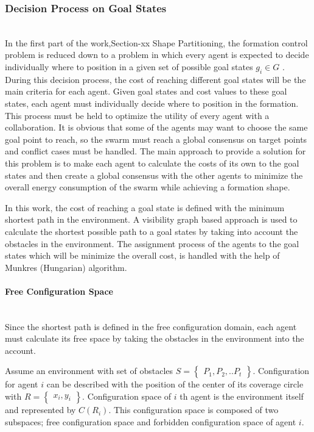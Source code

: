	
\subsubsection{Decision Process on Goal States}\hspace{0pt} \\
In the first part of the work,Section-xx Shape Partitioning, the formation control problem is reduced down to a problem in which every agent is expected to decide individually where to position in a given set of possible goal states $g_i \in G$ .  During this decision process, the cost of reaching different goal states will be the main criteria for each agent. Given goal states and cost values to these goal states, each agent must individually  decide where to position in the formation. This process must be held to optimize the utility of every agent with a collaboration. It is obvious that some of the agents may want to choose the same goal point to reach, so the swarm must reach a global consensus on target points and conflict cases must be handled. The main approach to provide a solution for this problem is to make each agent to calculate the costs of its own to the goal states and then create a global consensus with the other agents to minimize the overall energy consumption of the swarm while achieving a formation shape. 

In this work, the cost of reaching a goal state is defined with the minimum shortest path in the environment. A visibility graph based approach is used to calculate the shortest possible path to a goal states by taking into account the obstacles in the environment. The assignment process of the agents to the goal states which will be minimize the overall cost, is handled with the help of Munkres (Hungarian)  algorithm.
	
\paragraph{Free Configuration Space}\hspace{0pt} \\
Since the shortest path is defined in the free configuration domain, each agent must calculate its free space by taking the obstacles in the environment into the account. 

Assume an environment with set of obstacles $S = \begin{Bmatrix}
P_1, P_2, .. P_t \end{Bmatrix}$. Configuration for agent $i$ can be described with the position of the center of its coverage circle with $R=\begin{Bmatrix}x_i, y_i\end{Bmatrix}$. Configuration space of $i$ th agent is the environment itself and represented by $C(R_i)$. This configuration space is composed of two subspaces; free configuration space and forbidden configuration space of agent $i$.

